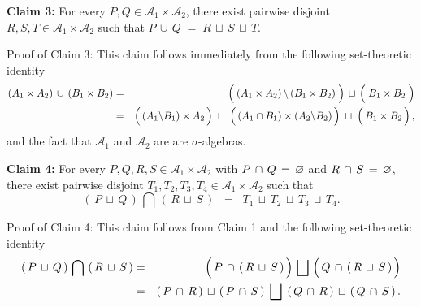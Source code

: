 \vskip 0.5cm
\begin{center}
\begin{minipage}{6.5in}
\textbf{Claim 3:}
\vskip 0.1cm
For every $P, Q \in \mathcal{A}_{1}\times\mathcal{A}_{2}$,
there exist pairwise disjoint $R, S, T \in \mathcal{A}_{1}\times\mathcal{A}_{2}$ such that
$P\,\cup\,Q \; = \; R \,\sqcup\, S \,\sqcup\, T$.
\end{minipage}
\end{center}
Proof of Claim 3:\quad
This claim follows immediately from the following set-theoretic identity
\begin{eqnarray*}
\left(A_{1} \times A_{2}\right)\,\cup\,\left(B_{1}\times B_{2}\right)
	&=&
		\left({\color{white}\overset{.}{!}}\!\!
			\left.\left(A_{1} \times A_{2}\right)\,\right\backslash\left(B_{1}\times B_{2}\right)
		{\color{white}\overset{.}{!}}\!\right)
		\,\sqcup\,
		\left( {\color{white}\overset{.}{!}} B_{1}\times B_{2} {\color{white}\overset{.}{!}} \right)
\\
& = &
	\left(\,\left(A_{1} \backslash B_{1}\right) \overset{{\color{white}.}}{\times} A_{2}\,\right)
	\;\sqcup\;
	\left(\,\left(A_{1}\cap B_{1}\right) \overset{{\color{white}.}}{\times} \left(A_{2}\backslash B_{2}\right)\,\right)
	\;\sqcup\;
	\left(\,B_{1} \overset{{\color{white}.}}{\times} B_{2}\,\right),
\end{eqnarray*}
and the fact that $\mathcal{A}_{1}$ and $\mathcal{A}_{2}$ are are $\sigma$-algebras.

\vskip 0.5cm
\begin{center}
\begin{minipage}{6.5in}
\textbf{Claim 4:}
\vskip 0.1cm
For every $P,Q,R,S \in \mathcal{A}_{1}\times\mathcal{A}_{2}$ with
$P\,\cap\,Q\,=\,\varnothing$ and $R\,\cap\,S\,=\,\varnothing$,
there exist pairwise disjoint $T_{1}, T_{2}, T_{3}, T_{4} \in \mathcal{A}_{1}\times\mathcal{A}_{2}$ such that
\begin{equation*}
\left(\,P\,\sqcup\,Q\,\right)\,\bigcap\,\left(\,R\,\sqcup\,S\,\right)
\;\; = \;\;
	T_{1} \,\sqcup\, T_{2} \,\sqcup\, T_{3} \,\sqcup\, T_{4}.
\end{equation*}
\end{minipage}
\end{center}
Proof of Claim 4:\quad
This claim follows from Claim 1 and the following set-theoretic identity
\begin{eqnarray*}
\left(\,P\,\sqcup\,Q\,\right)\,\bigcap\,\left(\,R\,\sqcup\,S\,\right)
& = &
	\left(\,P\,\overset{{\color{white}.}}{\cap}\,\left(\,R\,\sqcup\,S\,\right)\,\right)
	\,\bigsqcup\,
	\left(\,Q\,\overset{{\color{white}.}}{\cap}\,\left(\,R\,\sqcup\,S\,\right)\,\right)
\\
& = &
	\left(\,P\,\cap\,R\,\right) \,\overset{{\color{white}.}}{\sqcup}\, \left(\,P\,\cap\,S\,\right)
	\;\bigsqcup\;
	\left(\,Q\,\cap\,R\,\right) \,\overset{{\color{white}.}}{\sqcup}\, \left(\,Q\,\cap\,S\,\right).
\end{eqnarray*}

